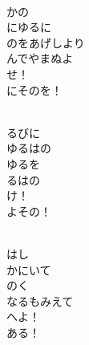 \documentclass[10pt,b5j]{tarticle} %
\begin{document}
\vspace{1.5em} %
\newcommand{\linespace}{0.5em} %
\newcommand{\blocksize}{0.5\hsize} %
\newcommand{\itemmargin}{3em} %
\begin{enumerate} %
    \setlength{\itemindent}{\itemmargin} %
    \begin{minipage}[c]{\blocksize}
    
        \vspace{\linespace}
        \item~\\
        かの\\
        にゆるに\\
        のをあげしより\\
        んでやまぬよ\\
        せ！\\
        にそのを！
        
    \end{minipage}
    \begin{minipage}[c]{\blocksize}
        
        \vspace{\linespace}
        \item~\\
        るびに\\
        ゆるはの\\
        ゆるを\\
        るはの\\
        け！\\
        よその！
        
    \end{minipage}
    \begin{minipage}[c]{\blocksize}
        
        \vspace{\linespace}
        \item~\\
        はし\\
        かにいて\\
        のく\\
        なるもみえて\\
        へよ！\\
        ある！
    
    \end{minipage}
\end{enumerate} %
\end{document}
